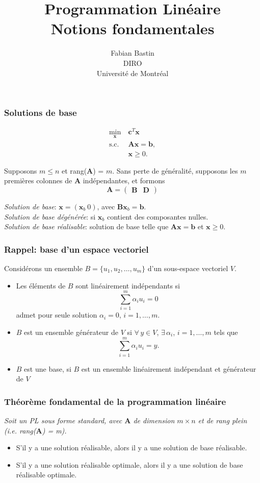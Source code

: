 \documentclass[usepdftitle=false]{beamer}
\title[Notions fondamentales]{Programmation Linéaire\\Notions fondamentales}
\author[Fabian Bastin]{Fabian Bastin\\DIRO\\Université de Montréal}
\date{}
\def\bb{\boldsymbol{b}}
\def\bc{\boldsymbol{c}}
\def\bx{\boldsymbol{x}}
\def\bA{\boldsymbol{A}}
\def\bB{\boldsymbol{B}}
\def\bD{\boldsymbol{D}}
\begin{document}
\frame{\titlepage}

\begin{frame}
\frametitle{Solutions de base}

\begin{align*}
\min_{\bx}\ & \bc^T \bx \\
\mbox{s.c. } & \bA \bx = \bb, \\
 & \bx \geq 0.
\end{align*}

\mbox{}

Supposons $m \leq n$ et rang($\bA$) = $m$.
Sans perte de généralité, supposons les $m$ premières colonnes de $\bA$ indépendantes, et formons
\[
\bA =
\begin{pmatrix}
 \bB & \bD
\end{pmatrix}
\]

\mbox{}

{\it Solution de base}: $\bx = (\bx_b \ 0)$, avec $\bB\bx_b = \bb$.\\
{\it Solution de base dégénérée}: si $\bx_b$ contient des composantes nulles. \\
{\it Solution de base réalisable}: solution de base telle que $\bA\bx = \bb$ et $\bx \geq 0$.
\end{frame}

\begin{frame}
\frametitle{Rappel: base d'un espace vectoriel}

Considérons un ensemble $B = \lbrace u_1, u_2,\ldots, u_m \rbrace$ d'un sous-espace vectoriel $V$.

\begin{itemize}
\item 
Les éléments de $B$ sont linéairement indépendants si
$$
\sum_{i=1}^m \alpha_i u_i = 0
$$
admet pour seule solution $\alpha_i = 0$, $i = 1,\ldots,m$.
\item
$B$ est un ensemble générateur de $V$ si $\forall\, y \in V$, $\exists\, \alpha_i$, $i = 1,\ldots,m$ tels que
$$
\sum_{i=1}^m \alpha_i u_i = y.
$$
\item
$B$ est une base, si $B$ est un ensemble
linéairement indépendant et générateur
de $V$
\end{itemize}

\end{frame}

\begin{frame}
\frametitle{Théorème fondamental de la programmation linéaire}

{\it
Soit un PL sous forme standard, avec $\bA$ de dimension $m \times n$ et de rang plein (i.e. rang($\bA$) = m).
\begin{itemize}
\item
S'il y a une solution réalisable, alors il y a une solution de base réalisable.
\item
S'il y a une solution réalisable optimale, alors il y a une solution de base réalisable optimale.
\end{itemize}
}

\end{frame}
\end{document}
